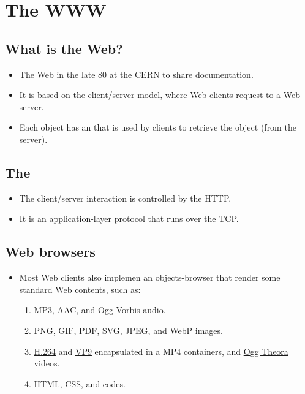 \chapter{The \gls{WWW}}

\section{What is the Web?}
\begin{itemize}
\item The Web  in the late 80 at the
  \gls{CERN} to share documentation.
\item It is based on the client/server model, where Web clients request
   to a Web server.
\item Each object has an  that
  is used by clients to retrieve the object (from the server).
\end{itemize}

\section{The }
\begin{itemize}
\item The client/server interaction is controlled by the \gls{HTTP}.
\item It is an application-layer protocol that runs over the \gls{TCP}.
\end{itemize}

\section{Web browsers}
\begin{itemize}
\item Most Web clients also implemen an objects-browser that  render
  some standard Web contents, such as:
  \begin{enumerate}
  \item \href{}{\gls{MP3}}, \gls{AAC}, and \href{}{Ogg Vorbis} audio.
  \item \gls{PNG}, \gls{GIF}, \gls{PDF}, \gls{SVG}, \gls{JPEG}, and \gls{WebP} images.
  \item \href{}{H.264} and \href{}{VP9} encapsulated in a \gls{MP4}
    containers, and \href{}{Ogg Theora} videos.
  \item \gls{HTML}, \gls{CSS}, and  codes.
  \end{enumerate}
\end{itemize}